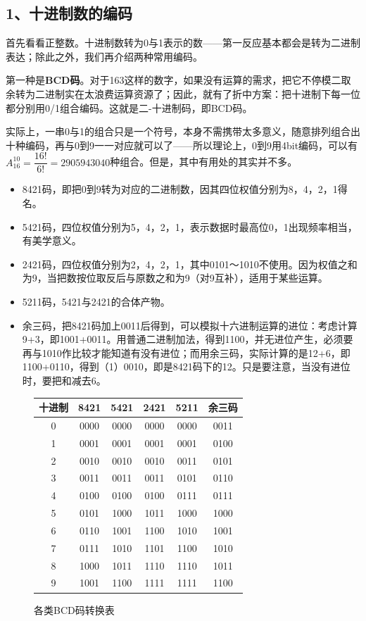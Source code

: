 \documentclass[UTF8]{ctexart}
\begin{document}
\subsection*{1、十进制数的编码}
首先看看正整数。十进制数转为0与1表示的数——第一反应基本都会是转为二进制表达；除此之外，我们再介绍两种常用编码。

第一种是\textbf{BCD码}。对于163这样的数字，如果没有运算的需求，把它不停模二取余转为二进制实在太浪费运算资源了；因此，就有了折中方案：把十进制下每一位都分别用0/1组合编码。这就是二-十进制码，即BCD码。

实际上，一串0与1的组合只是一个符号，本身不需携带太多意义，随意排列组合出十种编码，再与0到9一一对应就可以了——所以理论上，0到9用4bit编码，可以有$A_{16}^{10}=\dfrac{16!}{6!}=2905943040$种组合。但是，其中有用处的其实并不多。

\begin{itemize}
\item 8421码，即把0到9转为对应的二进制数，因其四位权值分别为8，4，2，1得名。
\item 5421码，四位权值分别为5，4，2，1，表示数据时最高位0，1出现频率相当，有美学意义。
\item 2421码，四位权值分别为2，4，2，1，其中0101～1010不使用。因为权值之和为9，当把数按位取反后与原数之和为9（对9互补），适用于某些运算。
\item 5211码，5421与2421的合体产物。
\item 余三码，把8421码加上0011后得到，可以模拟十六进制运算的进位：考虑计算9+3，即1001+0011。用普通二进制加法，得到1100，并无进位产生，必须要再与1010作比较才能知道有没有进位；而用余三码，实际计算的是12+6，即1100+0110，得到（1）0010，即是8421码下的12。只是要注意，当没有进位时，要把和减去6。
\end{itemize}

\begin{figure}
    \begin{tabular}{|c|c|c|c|c|c|}\hline\rowcolor{lightgray}
        十进制 & 8421 & 5421 & 2421 & 5211 & 余三码\\\hline
        0&0000&0000&0000&0000&0011\\\hline
        1&0001&0001&0001&0001&0100\\\hline
        2&0010&0010&0010&0011&0101\\\hline
        3&0011&0011&0011&0101&0110\\\hline
        4&0100&0100&0100&0111&0111\\\hline
        5&0101&1000&1011&1000&1000\\\hline
        6&0110&1001&1100&1010&1001\\\hline
        7&0111&1010&1101&1100&1010\\\hline
        8&1000&1011&1110&1110&1011\\\hline
        9&1001&1100&1111&1111&1100\\\hline
    \end{tabular}
    \caption*{各类BCD码转换表}
\end{figure}
\end{document}
